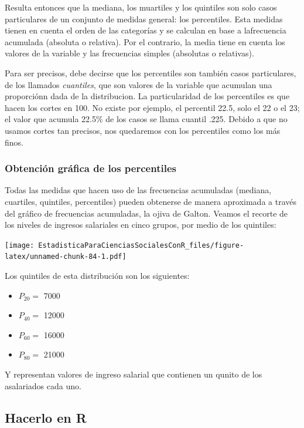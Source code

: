 \documentclass[]{book}
\providecommand{\tightlist}{%
  \setlength{\itemsep}{0pt}\setlength{\parskip}{0pt}}
\begin{document}
Resulta entonces que la mediana, los muartiles y los quintiles son solo casos particulares de un conjunto de medidas general: los percentiles. Esta medidas tienen en cuenta el orden de las categorías y se calculan en base a lafrecuencia acumulada (absoluta o relativa). Por el contrario, la media tiene en cuenta los valores de la variable y las frecuencias simples (absolutas o relativas).

Para ser precisos, debe decirse que los percentiles son también casos particulares, de los llamados \emph{cuantiles}, que son valores de la variable que acumulan una proporciónn dada de la distribucion. La particularidad de los percentiles es que hacen los cortes en 100. No existe por ejemplo, el percentil 22.5, solo el 22 o el 23; el valor que acumula 22.5\% de los casos se llama cuantil .225. Debido a que no usamos cortes tan precisos, nos quedaremos con los percentiles como los más finos.

\hypertarget{obtenciuxf3n-gruxe1fica-de-los-percentiles}{%
\subsubsection{Obtención gráfica de los percentiles}\label{obtenciuxf3n-gruxe1fica-de-los-percentiles}}

Todas las medidas que hacen uso de las frecuencias acumuladas (mediana, cuartiles, quintiles, percentiles) pueden obtenerse de manera aproximada a través del gráfico de frecuencias acumuladas, la ojiva de Galton. Veamos el recorte de los niveles de ingresos salariales en cinco grupos, por medio de los quintiles:

\texttt{[image: EstadisticaParaCienciasSocialesConR\_files/figure-latex/unnamed-chunk-84-1.pdf]}

Los quintiles de esta distribución son los siguientes:

\begin{itemize}
\tightlist
\item
  \(P_{20} =\) 7000
\item
  \(P_{40} =\) 12000
\item
  \(P_{60} =\) 16000
\item
  \(P_{80} =\) 21000
\end{itemize}

Y representan valores de ingreso salarial que contienen un qunito de los asalariados cada uno.

\hypertarget{hacerlo-en-r}{%
\subsection{Hacerlo en R}\label{hacerlo-en-r}}
\end{document}
